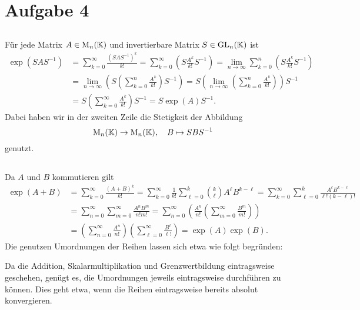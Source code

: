 \documentclass[a4paper, 10pt]{article}
\begin{document}
\section{Aufgabe 4}





\subsection{}
Für jede Matrix $A \in \operatorname{M}_n(\mathbb{K})$ und invertierbare Matrix $S \in \operatorname{GL}_n(\mathbb{K})$ ist
\begin{align*}
      \exp(S A S^{-1})
  &=  \sum_{k=0}^\infty \frac{(S A S^{-1})^k}{k!}
   =  \sum_{k=0}^\infty \left( S \frac{A^k}{k!} S^{-1} \right)
   =  \lim_{n \to \infty} \sum_{k=0}^n \left( S \frac{A^k}{k!} S^{-1} \right) \\
  &=  \lim_{n \to \infty} \left( S \left( \sum_{k=0}^n \frac{A^k}{k!} \right) S^{-1} \right)
   =  S \left( \lim_{n \to \infty} \left( \sum_{k=0}^n \frac{A^k}{k!} \right) \right) S^{-1} \\
  &=  S \left( \sum_{k=0}^\infty \frac{A^k}{k!} \right) S^{-1}
   =  S \exp(A) S^{-1}.
\end{align*}
Dabei haben wir in der zweiten Zeile die Stetigkeit der Abbildung
\[
  \operatorname{M}_n(\mathbb{K}) \to \operatorname{M}_n(\mathbb{K}),
  \quad
  B \mapsto S B S^{-1}
\]
genutzt.





\subsection{}
Da $A$ und $B$ kommutieren gilt
\begin{align*}
      \exp(A+B)
  &=  \sum_{k=0}^\infty \frac{(A+B)^k}{k!}
   =  \sum_{k=0}^\infty \frac{1}{k!} \sum_{\ell=0}^k \binom{k}{\ell} A^\ell B^{k-\ell}
   =  \sum_{k=0}^\infty \sum_{\ell=0}^k \frac{A^\ell B^{k-\ell}}{\ell! (k-\ell)!} \\
  &=  \sum_{n=0}^\infty \sum_{m=0}^\infty \frac{A^n B^m}{n! m!}
   =  \sum_{n=0}^\infty \left( \frac{A^n}{n!} \left( \sum_{m=0}^\infty \frac{B^m}{m!} \right) \right) \\
  &=  \left( \sum_{n=0}^\infty \frac{A^n}{n!} \right) \left( \sum_{\ell=0}^\infty \frac{B^\ell}{\ell!} \right)
   =  \exp(A) \exp(B).
\end{align*}
Die genutzen Umordnungen der Reihen lassen sich etwa wie folgt begründen:

Da die Addition, Skalarmultiplikation und Grenzwertbildung eintragsweise geschehen, genügt es, die Umordnungen jeweils eintragsweise durchführen zu können.
Dies geht etwa, wenn die Reihen eintragsweise bereits absolut konvergieren.
\end{document}

